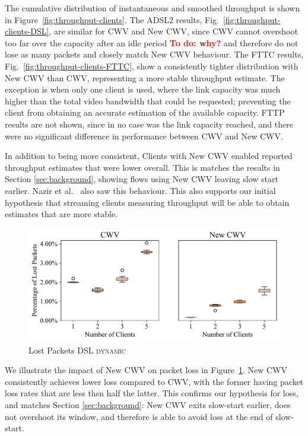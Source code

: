 \documentclass[10pt,sigconf]{acmart}
\newcommand{\todo}[1]{\textbf{\textcolor{red}{To do: #1}}}
\begin{document}
The cumulative distribution of instantaneous and smoothed throughput is shown in 
Figure~\ref{fig:throughput-clients}. 
%
The ADSL2 results, Fig.\ \ref{fig:throughput-clients-DSL}, are similar for CWV and New CWV, since CWV cannot overshoot too far over the capacity after an idle period \todo{why?} and therefore do not lose as many packets and closely match New CWV behaviour. 
The FTTC results, Fig.\ \ref{fig:throughput-clients-FTTC}, show a consistently tighter distribution with New CWV than CWV, representing a more stable throughput estimate. The exception is when only one client is used, where the link capacity was much higher than the total video bandwidth that could be requested; preventing the client from obtaining an accurate estimation of the available capacity.
%
FTTP results are not shown, since in no case was the link capacity reached, and there were no significant difference in performance between CWV and New CWV.

In addition to being more consistent, 
Clients with New CWV enabled reported throughput estimates that were lower overall.
This is matches the results in Section \ref{sec:background}, showing flows using New CWV leaving slow start earlier.
Nazir et al.~\cite{Nazir-2014-performance-evaluation-congestion-window-validation-dash-newcwv} also saw this behaviour. This also supports our initial hypothesis that streaming clients measuring throughput will be able to obtain estimates that are more stable. 

\begin{figure}[t!]
  \centering
  \includegraphics[width=.45\textwidth]{figures/lost_packets.pdf}
  \caption{Lost Packets DSL \textsc{dynamic}}
  \label{fig:lost-packets}
\end{figure}

We illustrate the impact of New CWV on packet loss in Figure~\ref{fig:lost-packets}. New CWV consistently achieves lower loss compared to CWV, with the former having packet loss rates that are less thsn half the latter. This confirms our hypothesis for loss, and matches Section \ref{sec:background}: New CWV exits slow-start earlier, does not overshoot its window, and therefore is able to avoid loss at the end of slow-start.
\end{document}
